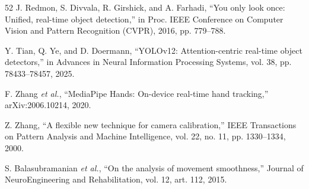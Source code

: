 \documentclass[journal,twoside,web]{ieeecolor2}
\begin{document}
\begin{thebibliography}{52}
\label{bib:b48} J. Redmon, S. Divvala, R. Girshick, and A. Farhadi, ``You only look once: Unified, real-time object detection,'' in Proc. IEEE Conference on Computer Vision and Pattern Recognition (CVPR), 2016, pp. 779--788.

\label{bib:b49} Y. Tian, Q. Ye, and D. Doermann, ``YOLOv12: Attention-centric real-time object detectors,'' in Advances in Neural Information Processing Systems, vol. 38, pp. 78433--78457, 2025.

\label{bib:b50} F. Zhang \emph{et al.}, ``MediaPipe Hands: On-device real-time hand tracking,'' arXiv:2006.10214, 2020.

\label{bib:b51} Z. Zhang, ``A flexible new technique for camera calibration,'' IEEE Transactions on Pattern Analysis and Machine Intelligence, vol. 22, no. 11, pp. 1330--1334, 2000.

\label{bib:b52} S. Balasubramanian \emph{et al.}, ``On the analysis of movement smoothness,'' Journal of NeuroEngineering and Rehabilitation, vol. 12, art. 112, 2015.

\end{thebibliography}
\end{document}
